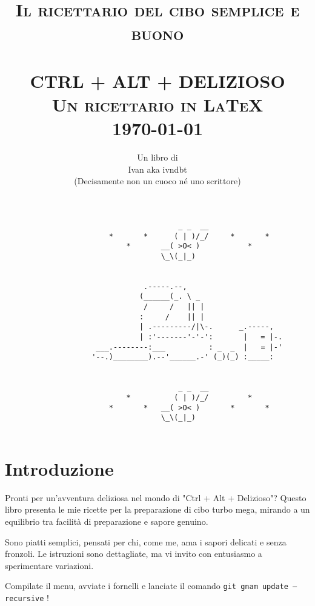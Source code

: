 \documentclass[12pt]{article}
\title{	\normalsize \textsc{Il ricettario del cibo semplice e buono} 	%
		 	\\[1.5cm]								%
			\HRule{0.5pt} \\						%
			\LARGE \textbf{\uppercase{Ctrl + Alt + Delizioso}}\\[0.2cm]	%
			\normalsize \textsc{Un ricettario in LaTeX}
			\HRule{0.5pt} \\ [0.5cm]		%
			\normalsize \today			%
			\\ [2cm]
		}
\author{
		Un libro di\\	
		Ivan aka ivndbt\\ [0.2cm]
		\scriptsize(Decisamente non un cuoco né uno scrittore)\\ [1cm]
		}
\makeatletter
\def\printtitle{%
    {\centering \@title \par}}
\def\printauthor{%
    {\centering \large \@author}}
\makeatother
\begin{document}
\thispagestyle{empty}		%

\printtitle					%
\begin{lstlisting}
										_ _  __
						*		*	   ( | )/_/		*		*
							*		__( >O< )  			*
									\_\(_|_)   


					            .-----.--,
					           (______(_. \ _
					            /     /   || |
					           :     /    || |
					           | .---------/|\-.      _.-----,
					           | :'-------'-'-':       |   = |-.
					 ___.--------:___          : _  _  |   = |-'
					'--.)________).--'______.-' (_)(_) :_____:


										_ _  __
							*		   ( | )/_/			*
						*		*	__( >O< )  		*		*
									\_\(_|_)   
	
\end{lstlisting}
  	\vfill
\printauthor				%
\newpage

\pagestyle{fancy}

\chead{ } %

\setcounter{page}{1}		%
\section*{Introduzione}
Pronti per un'avventura deliziosa nel mondo di "Ctrl + Alt + Delizioso"? 
Questo libro presenta le mie ricette per la preparazione di cibo turbo mega, 
mirando a un equilibrio tra facilità di preparazione e sapore genuino. 

Sono piatti semplici, pensati per chi, come me, ama i sapori delicati e senza fronzoli. 
Le istruzioni sono dettagliate, ma vi invito con entusiasmo a sperimentare variazioni. 

Compilate il menu, avviate i fornelli e lanciate il comando \texttt{git gnam update ---recursive} !
\end{document}
